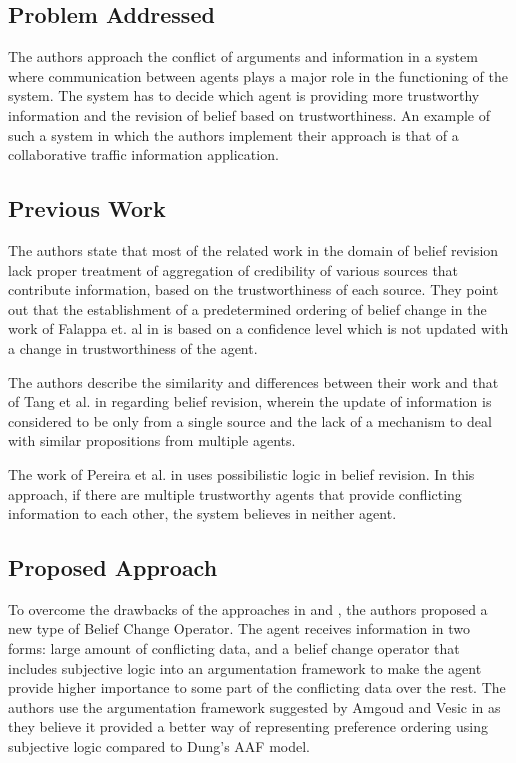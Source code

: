 \documentclass[UTF8]{article}
\begin{document}
\subsection{Problem Addressed}
The authors approach the conflict of arguments and information in a system where communication between agents plays
a major role in the functioning of the system. The system has to decide which agent is providing more trustworthy information
and the revision of belief based on trustworthiness. 
An example of such a system in which the authors implement their approach 
is that of a collaborative traffic information application. 

\subsection{Previous Work}
The authors state that most of the related work in the domain of belief revision lack proper treatment of aggregation of credibility 
of various sources that contribute information, based on the trustworthiness of each source. They point out that the establishment of a 
predetermined ordering of belief change in 
the work of Falappa et. al in \cite{Falappa} is based on a confidence level which is not updated with a change in trustworthiness of the agent.

The authors describe the similarity and differences between their work and that of Tang et al. in \cite{Tang2012UsingAT} regarding belief revision, wherein the update of information is considered
to be only from a single source and the lack of a mechanism to deal with similar propositions from multiple agents. 

The work of Pereira et al. in \cite{Pereira} uses possibilistic logic in belief revision. In this approach, if there are multiple 
trustworthy agents that provide conflicting information to each other, the system believes in neither agent.

\subsection{Proposed Approach}
To overcome the drawbacks of the approaches in \cite{Falappa} and \cite{Tang2012UsingAT}, the authors proposed a new type of Belief Change Operator. 
The agent receives information in two forms: large amount of conflicting data, and a belief change operator that includes subjective logic
into an argumentation framework to make the agent provide higher importance to some part of the conflicting data over the rest. The authors use 
the argumentation framework suggested by Amgoud and Vesic in \cite{AMGOUD2014585} as they believe it provided a better way of representing preference
ordering using subjective logic compared to Dung's \cite{DUNG1995321} AAF model.
\end{document}
